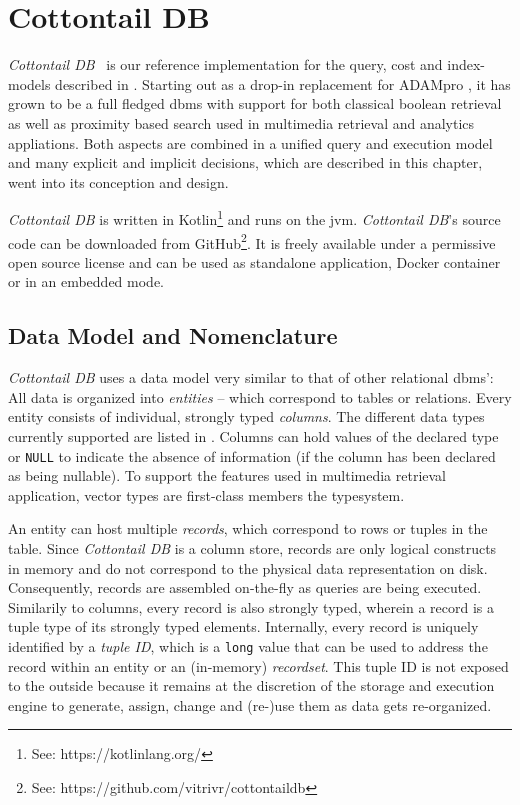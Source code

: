 \chapter{Cottontail DB}
\label{chapter:cottontaildb}

\emph{Cottontail DB}~\cite{Gasser:2020cottontail} is our reference implementation for the query, cost and index-models described in . Starting out as a drop-in replacement for ADAMpro \cite{Giangreco:2016adam}, it has grown to be a full fledged \acrshort{dbms} with support for both classical boolean retrieval as well as proximity based search used in multimedia retrieval and analytics appliations. Both aspects are combined in a unified query and execution model and many explicit and implicit decisions, which are described in this chapter, went into its conception and design.

\emph{Cottontail DB} is written in Kotlin\footnote{See: https://kotlinlang.org/} and runs on the \acrfull{jvm}. \emph{Cottontail DB}'s source code can be downloaded from GitHub\footnote{See: https://github.com/vitrivr/cottontaildb}. It is freely available under a permissive open source license and can be used as standalone application, Docker container or in an embedded mode.

\section{Data Model and Nomenclature} 

\emph{Cottontail DB} uses a data model very similar to that of other relational \acrshort{dbms}': All data is organized into \emph{entities} -- which correspond to tables or relations. Every entity consists of individual, strongly typed \emph{columns}. The different data types currently supported are listed in . Columns can hold values of the declared type or \texttt{NULL} to indicate the absence of information (if the column has been declared as being nullable). To support the features used in multimedia retrieval application, vector types are first-class members the typesystem.

An entity can host multiple \emph{records}, which correspond to rows or tuples in the table. Since \emph{Cottontail DB} is a column store, records are only logical constructs in memory and do not correspond to the physical data representation on disk. Consequently, records are assembled on-the-fly as queries are being executed. Similarily to columns, every record is also strongly typed, wherein a record is a tuple type of its strongly typed elements. Internally, every record is uniquely identified by a \emph{tuple ID}, which is a \texttt{long} value that can be used to address the record within an entity or an (in-memory) \emph{recordset}. This tuple ID is not exposed to the outside because it remains at the discretion of the storage and execution engine to generate, assign, change and (re-)use them as data gets re-organized.


